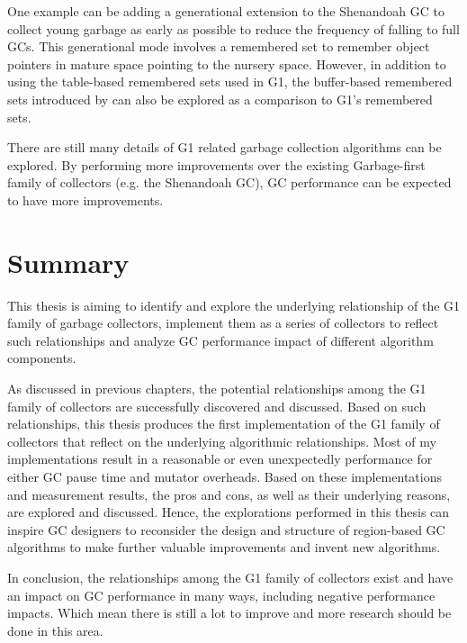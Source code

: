 One example can be adding a generational extension to the Shenandoah GC to collect
young garbage as early as possible to reduce the frequency of falling to full GCs.
This generational mode involves a remembered set to remember object pointers in mature
space pointing to the nursery space. However, in addition to using the table-based remembered
sets used in G1, the buffer-based remembered sets introduced by \cite{blackburn2008immix} can
also be explored as a comparison to G1's remembered sets.

There are still many details of G1 related garbage collection algorithms can be
explored. By performing more improvements over the existing Garbage-first family of collectors
(e.g. the Shenandoah GC), GC performance can be expected to have more improvements.

\section{Summary}

This thesis is aiming to identify and explore the underlying relationship of the
G1 family of garbage collectors, implement them as a series of collectors to
reflect such relationships and analyze GC performance impact of different algorithm components.

As discussed in previous chapters, the potential relationships among the G1 family of collectors
are successfully discovered and discussed.
Based on such relationships, this thesis produces the first implementation of the
G1 family of collectors that reflect on the underlying algorithmic relationships.
Most of my implementations result in a reasonable
or even unexpectedly performance for either GC pause time and mutator overheads.
Based on these implementations and measurement results, the pros and cons, as well
as their underlying reasons, are explored and discussed.
Hence, the explorations performed in this thesis can inspire GC designers to
reconsider the design and structure of region-based GC algorithms to make
further valuable improvements and invent new algorithms.

In conclusion, the relationships among the G1 family of collectors exist and have
an impact on GC performance in many ways, including negative performance impacts.
Which mean there is still a lot to improve and more research should be done in this area.





